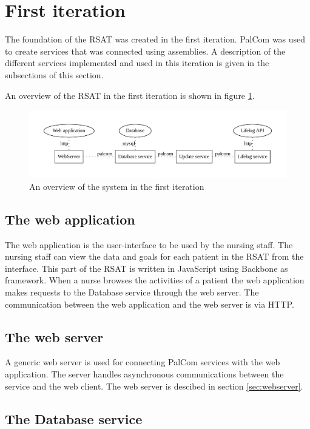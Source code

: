 \documentclass{cslthse-msc}
\begin{document}
\section{First iteration}
The foundation of the RSAT was created in the first iteration. PalCom was used to create services that was connected using assemblies. A description of the different services implemented and used in this iteration is given in the subsections of this section. 

An overview of the RSAT in the first iteration is shown in figure \ref{fig:second-version}.


\begin{figure}[!hbt]
\centering
\includegraphics[scale=0.6]{second-version.pdf} 
\caption{An overview of the system in the first iteration}\label{fig:second-version}
\end{figure}

\subsection{The web application}

The web application is the user-interface to be used by the nursing staff. The nursing staff can view the data and goals for each patient in the RSAT from the interface. This part of the RSAT is written in JavaScript using Backbone as framework. When a nurse browses the activities of a patient the web application makes requests to the Database service through the web server. The communication between the web application and the web server is via HTTP.

\subsection{The web server} %

A generic web server is used for connecting PalCom services with the web application. The server handles asynchronous communications between the service and the web client. The web server is descibed in section \ref{sec:webserver}.


\subsection{The Database service}
\end{document}
